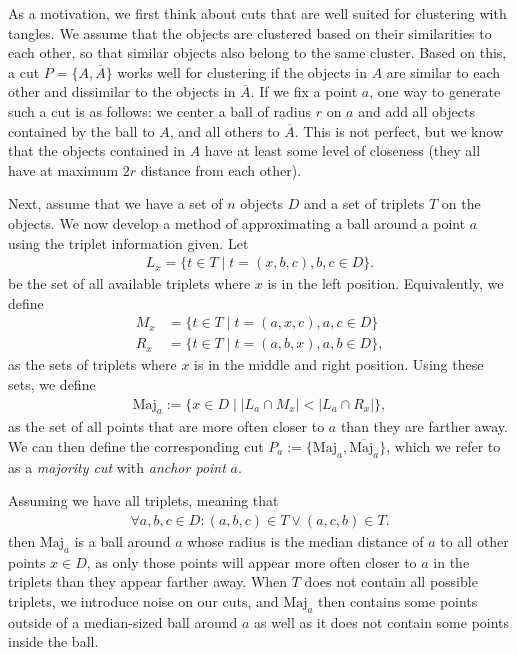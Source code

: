 As a motivation, we first think about cuts that are well suited for clustering with tangles.
We assume that the objects are clustered based on their similarities to each other, so that 
similar objects also belong to the same cluster. Based on this, a cut $P = \{A, \overline{A}\}$ works well for clustering if the objects in $A$ are similar to each other and
dissimilar to the objects in $\overline{A}$. If we fix a point $a$, one way
to generate such a cut is as follows: 
we center a ball of radius $r$ on $a$ and add all objects contained by the ball to $A$, 
and all others to $\overline{A}$. This is not perfect, but we know that the objects
contained in $A$ have at least some level of closeness (they all have 
at maximum $2r$ distance from each other). 

Next, assume that we have a set of $n$ objects $D$ and a set of triplets $T$ on the
objects. We now develop a method of approximating a ball around a point $a$ using the
triplet information given. Let 
\begin{align*}
L_x = \{t \in T  \mid  t = (x, b,c), b,c \in D\} 
.\end{align*}
be the set of all available triplets where $x$ is in the left position. Equivalently, 
we define 
\begin{align*}
    M_x &=  \{t \in T  \mid  t = (a, x, c), a,c \in D\} \\
    R_x &=  \{t \in T  \mid  t = (a, b, x), a,b \in D\} 
,\end{align*}
as the sets of triplets where $x$ is in the middle and right position. 
Using these sets, we define  
\begin{align*}
    \text{Maj} _a := \{x \in D \mid \left| L_a \cap M_x\right| < \left| L_a \cap R_x \right| \}
,\end{align*}
as the set of all points that are more often closer to $a$ than they are farther away. 
We can then define the corresponding cut $P_a := \{ \text{Maj}_a, \overline{\text{Maj}_a } \}$, which
we refer to as a \textit{majority cut} with \textit{anchor point} $a$.

Assuming we have all triplets, meaning that 
\begin{align*}
    \forall a,b,c \in D: (a,b,c) \in T \vee (a,c,b) \in T
.\end{align*}
then $\text{Maj}_a$ is a ball around $a$ whose radius is the median distance of $a$ to all other points $x \in D$, as only those points will appear more often closer to $a$ in the triplets
than they appear farther away. When $T$ does not contain all possible triplets, we introduce 
noise on our cuts, and $\text{Maj}_a$ then contains some points outside of a median-sized ball
around $a$ as well as it does not contain some points inside the ball.

